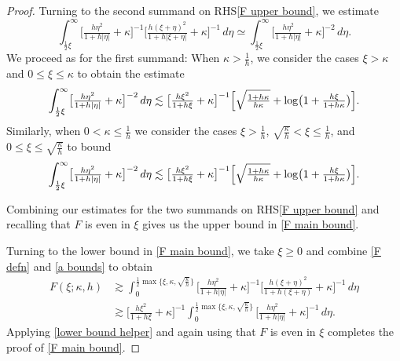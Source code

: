 \documentclass[10pt,a4paper]{amsart}
\begin{document}
\begin{proof}
Turning to the second summand on RHS\eqref{F upper bound}, we estimate
\[
\int_{\frac12\xi}^\infty \bigl[\tfrac{h\eta^2}{1+h|\eta|} +\kappa\bigr]^{-1}\bigl[\tfrac{h(\xi+\eta)^2}{1+h|\xi+\eta|} + \kappa\bigr]^{-1} \,d\eta\simeq \int_{\frac12\xi}^\infty \bigl[\tfrac{h\eta^2}{1+h|\eta|} +\kappa\bigr]^{-2}\,d\eta.
\]
We proceed as for the first summand: When \(\kappa>\frac1h\), we consider the cases \(\xi>\kappa\) and \(0\leq\xi\leq \kappa\) to obtain the estimate
\[
\int_{\frac12\xi}^\infty \bigl[\tfrac{h\eta^2}{1+h|\eta|} +\kappa\bigr]^{-2}\,d\eta\lesssim \bigl[\tfrac{h\xi^2}{1+h\xi} +\kappa\bigr]^{-1}\Bigl[\sqrt{\tfrac{1+h\kappa}{h\kappa}} + \log\bigl(1 + \tfrac{h\xi}{1+h\kappa}\bigr)\Bigr].
\]
Similarly, when \(0<\kappa\leq \frac1h\) we consider the cases \(\xi>\frac1h\), \(\sqrt{\frac\kappa h}<\xi\leq \frac1h\), and \(0\leq\xi\leq \sqrt{\frac\kappa h}\) to bound
\[
\int_{\frac12\xi}^\infty \bigl[\tfrac{h\eta^2}{1+h|\eta|} +\kappa\bigr]^{-2}\,d\eta\lesssim \bigl[\tfrac{h\xi^2}{1+h\xi} +\kappa\bigr]^{-1}\Bigl[\sqrt{\tfrac{1+h\kappa }{h\kappa}} + \log\bigl(1 + \tfrac{h\xi}{1+h\kappa}\bigr)\Bigr].
\]

Combining our estimates for the two summands on RHS\eqref{F upper bound} and recalling that \(F\) is even in \(\xi\) gives us the upper bound in \eqref{F main bound}.

Turning to the lower bound in \eqref{F main bound}, we take \(\xi\geq 0\) and combine \eqref{F defn} and \eqref{a bounds} to obtain
\begin{align*}
F(\xi;\kappa,h) &\gtrsim \int_0^{\frac12\max\{\xi,\kappa,\sqrt{\frac\kappa h}\}} \bigl[\tfrac{h\eta^2}{1+h|\eta|} +\kappa\bigr]^{-1}\bigl[\tfrac{h(\xi+\eta)^2}{1+h(\xi+\eta)} + \kappa\bigr]^{-1} \,d\eta\\
&\gtrsim \bigl[\tfrac{h\xi^2}{1+h\xi} + \kappa\bigr]^{-1}\int_0^{\frac12\max\{\xi,\kappa,\sqrt{\frac\kappa h}\}} \bigl[\tfrac{h\eta^2}{1+h|\eta|} +\kappa\bigr]^{-1} \,d\eta.
\end{align*}
Applying \eqref{lower bound helper} and again using that \(F\) is even in \(\xi\) completes the proof of \eqref{F main bound}. 
\end{proof}
\end{document}
